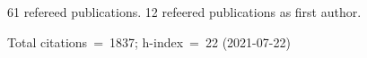 61 refereed publications. 12 refeered publications as first author.

Total citations~=~1837; h-index~=~22 (2021-07-22)